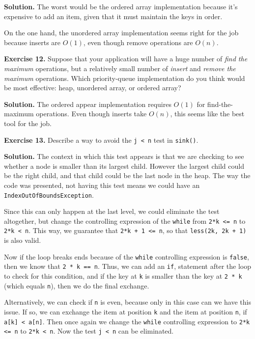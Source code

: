 \documentclass[12pt, a4paper]{article}
\newenvironment{ex}[2][Exercise]
{\par\medskip\noindent \textbf{#1 #2.}}
{\medskip}
\newenvironment{sol}[1][Solution]
{\par\medskip\noindent \textbf{#1.} }
{\medskip}
\begin{document}
	\begin{sol}
		The worst would be the ordered array implementation because it's expensive
		to add an item, given that it must maintain the keys in order.
		
		On the one hand, the unordered array implementation seems right for the job
		because inserts are $O(1)$, even though remove operations are $O(n)$.
	\end{sol}
	\begin{ex}{12}
		Suppose that your application will have a huge number of \emph{find the maximum}
		operations, but a relatively small number of \emph{insert} and \emph{remove the maximum}
		operations. Which priority-queue implementation do you think would be most effective:
		heap, unordered array, or ordered array?
	\end{ex}
	\begin{sol}
		The ordered appear implementation requires $O(1)$ for find-the-maximum operations.
		Even though inserts take $O(n)$, this seems like the best tool for the job.
	\end{sol}
	\begin{ex}{13}
		Describe a way to avoid the \texttt{j < n} test in \texttt{sink()}.
	\end{ex}
	\begin{sol}
		The context in which this test appears is that we are checking to see
		whether a node is smaller than its largest child. However the largest
		child could be the right child, and that child could be the last node
		in the heap. The way the code was presented, not having this test means
		we could have an \texttt{IndexOutOfBoundsException}.
		
		Since this can only happen at the last level, we could eliminate the
		test altogether, but change the controlling expression of the \texttt{while}
		from \texttt{2*k <= n} to \texttt{2*k < n}. This way, we guarantee that
		\texttt{2*k + 1 <= n}, so that \texttt{less(2k, 2k + 1)} is also valid.
		
		Now if the loop breaks ends because of the \texttt{while} controlling
		expression is \texttt{false}, then we know that \texttt{2 * k == n}.
		Thus, we can add an \texttt{if}, statement after the loop to check
		for this condition, and if the key at \texttt{k} is smaller than
		the key at \texttt{2 * k} (which equals \texttt{n}), then we do the
		final exchange.
		
		Alternatively, we can check if \texttt{n} is even, because only in this
		case can we have this issue. If so, we can exchange the item at position
		\texttt{k} and the item at position \texttt{n}, if \texttt{a[k] < a[n]}.
		Then once again we change the \texttt{while} controlling expression to
		\texttt{2*k <= n} to \texttt{2*k < n}. Now the test \texttt{j < n}
		can be eliminated.
	\end{sol}
\end{document}
